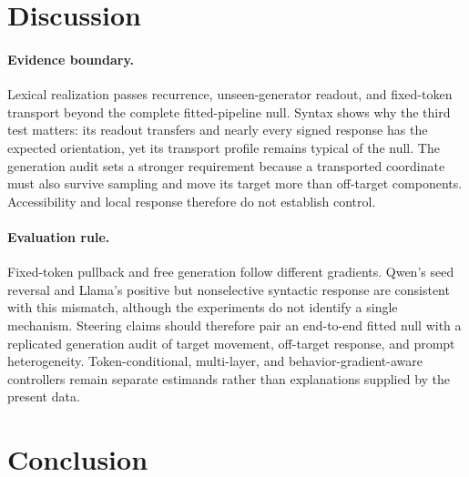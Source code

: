 \section{Discussion}

\paragraph{Evidence boundary.} Lexical realization passes recurrence, unseen-generator readout, and fixed-token transport beyond the complete fitted-pipeline null. Syntax shows why the third test matters: its readout transfers and nearly every signed response has the expected orientation, yet its transport profile remains typical of the null. The generation audit sets a stronger requirement because a transported coordinate must also survive sampling and move its target more than off-target components. Accessibility and local response therefore do not establish control.

\paragraph{Evaluation rule.} Fixed-token pullback and free generation follow different gradients. Qwen's seed reversal and Llama's positive but nonselective syntactic response are consistent with this mismatch, although the experiments do not identify a single mechanism. Steering claims should therefore pair an end-to-end fitted null with a replicated generation audit of target movement, off-target response, and prompt heterogeneity. Token-conditional, multi-layer, and behavior-gradient-aware controllers remain separate estimands rather than explanations supplied by the present data.

\section{Conclusion}

